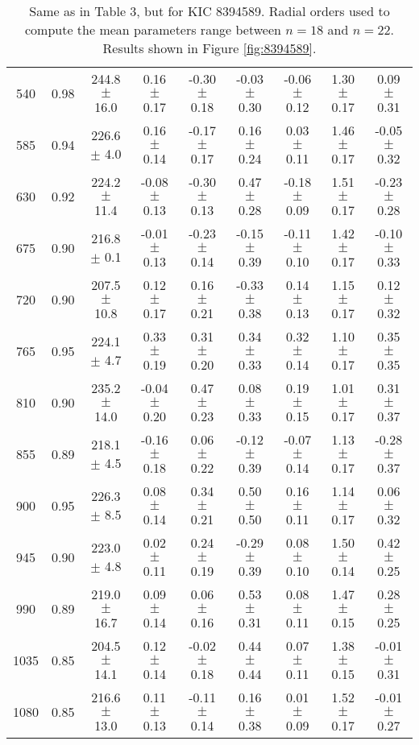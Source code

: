 \documentclass[twocolumn]{aastex61}%
\begin{document}
\begin{table*}[ht]
\begin{tabular}{ccc|ccccc|c}
540 & 0.98 & 244.8 $\pm$ 16.0 & 0.16 $\pm$ 0.17 & -0.30 $\pm$ 0.18 & -0.03 $\pm$ 0.30 & -0.06 $\pm$ 0.12 & 1.30 $\pm$ 0.17 & 0.09 $\pm$ 0.31\\
585 & 0.94 & 226.6 $\pm$ 4.0 & 0.16 $\pm$ 0.14 & -0.17 $\pm$ 0.17 & 0.16 $\pm$ 0.24 & 0.03 $\pm$ 0.11 & 1.46 $\pm$ 0.17 & -0.05 $\pm$ 0.32\\
630 & 0.92 & 224.2 $\pm$ 11.4 & -0.08 $\pm$ 0.13 & -0.30 $\pm$ 0.13 & 0.47 $\pm$ 0.28 & -0.18 $\pm$ 0.09 & 1.51 $\pm$ 0.17 & -0.23 $\pm$ 0.28\\
675 & 0.90 & 216.8 $\pm$ 0.1 & -0.01 $\pm$ 0.13 & -0.23 $\pm$ 0.14 & -0.15 $\pm$ 0.39 & -0.11 $\pm$ 0.10 & 1.42 $\pm$ 0.17 & -0.10 $\pm$ 0.33\\
720 & 0.90 & 207.5 $\pm$ 10.8 & 0.12 $\pm$ 0.17 & 0.16 $\pm$ 0.21 & -0.33 $\pm$ 0.38 & 0.14 $\pm$ 0.13 & 1.15 $\pm$ 0.17 & 0.12 $\pm$ 0.32\\
765 & 0.95 & 224.1 $\pm$ 4.7 & 0.33 $\pm$ 0.19 & 0.31 $\pm$ 0.20 & 0.34 $\pm$ 0.33 & 0.32 $\pm$ 0.14 & 1.10 $\pm$ 0.17 & 0.35 $\pm$ 0.35\\
810 & 0.90 & 235.2 $\pm$ 14.0 & -0.04 $\pm$ 0.20 & 0.47 $\pm$ 0.23 & 0.08 $\pm$ 0.33 & 0.19 $\pm$ 0.15 & 1.01 $\pm$ 0.17 & 0.31 $\pm$ 0.37\\
855 & 0.89 & 218.1 $\pm$ 4.5 & -0.16 $\pm$ 0.18 & 0.06 $\pm$ 0.22 & -0.12 $\pm$ 0.39 & -0.07 $\pm$ 0.14 & 1.13 $\pm$ 0.17 & -0.28 $\pm$ 0.37\\
900 & 0.95 & 226.3 $\pm$ 8.5 & 0.08 $\pm$ 0.14 & 0.34 $\pm$ 0.21 & 0.50 $\pm$ 0.50 & 0.16 $\pm$ 0.11 & 1.14 $\pm$ 0.17 & 0.06 $\pm$ 0.32\\
945 & 0.90 & 223.0 $\pm$ 4.8 & 0.02 $\pm$ 0.11 & 0.24 $\pm$ 0.19 & -0.29 $\pm$ 0.39 & 0.08 $\pm$ 0.10 & 1.50 $\pm$ 0.14 & 0.42 $\pm$ 0.25\\
990 & 0.89 & 219.0 $\pm$ 16.7 & 0.09 $\pm$ 0.14 & 0.06 $\pm$ 0.16 & 0.53 $\pm$ 0.31 & 0.08 $\pm$ 0.11 & 1.47 $\pm$ 0.15 & 0.28 $\pm$ 0.25\\
1035 & 0.85 & 204.5 $\pm$ 14.1 & 0.12 $\pm$ 0.14 & -0.02 $\pm$ 0.18 & 0.44 $\pm$ 0.44 & 0.07 $\pm$ 0.11 & 1.38 $\pm$ 0.15 & -0.01 $\pm$ 0.31\\
1080 & 0.85 & 216.6 $\pm$ 13.0 & 0.11 $\pm$ 0.13 & -0.11 $\pm$ 0.14 & 0.16 $\pm$ 0.38 & 0.01 $\pm$ 0.09 & 1.52 $\pm$ 0.17 & -0.01 $\pm$ 0.27\\
\end{tabular}
\caption{Same as in Table 3, but for KIC 8394589. Radial orders used to compute the mean parameters range between $n=18$ and $n=22$. Results shown in Figure \ref{fig:8394589}.}\label{tab:8394589}
\end{table*}
\end{document}
